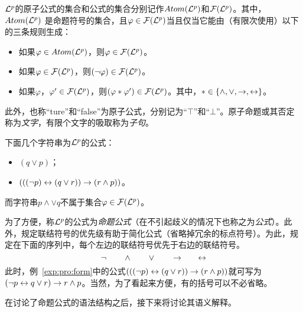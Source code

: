 ${\cal L}^p$的原子公式的集合和公式的集合分别记作$Atom({\cal L}^p)$和${\cal F}({\cal L}^p)$。其中，$Atom({\cal L}^p)$ 是命题符号的集合，且$\varphi\in {\cal F}({\cal L}^p)$当且仅当它能由（有限次使用）以下的三条规则生成\cite{luzhongwan1989}：
\begin{itemize}
	\item 如果$\varphi\in Atom({\cal L}^p)$，则$\varphi \in {\cal F}({\cal L}^p)$。
	\item 如果$\varphi \in {\cal F}({\cal L}^p)$，则$(\neg \varphi)\in {\cal F}({\cal L}^p)$。
	\item 如果$\varphi$，$\varphi'\in {\cal F}({\cal L}^p)$，则$(\varphi * \varphi')\in {\cal F}({\cal L}^p)$。其中，$*\in \{\wedge,\vee, \rightarrow, \leftrightarrow\}$。
\end{itemize}
此外，也称“ture”和“false”为原子公式，分别记为“$\top$”和“$\bot$”。原子命题或其否定称为\emph{文字}，有限个文字的吸取称为\emph{子句}。

\begin{example}\label{exp:pro:form}
	下面几个字符串为${\cal L}^p$的公式：
	\begin{itemize}
		\item $(q \vee p)$；
		\item $(((\neg p)\leftrightarrow(q\vee r))\rightarrow(r \wedge p))$。
	\end{itemize}
	而字符串$p\wedge \vee q$不属于集合$\varphi\in {\cal F}({\cal L}^p)$。
\end{example}


为了方便，称${\cal L}^p$的公式为\emph{命题公式}（在不引起歧义的情况下也称之为\emph{公式}）。此外，规定联结符号的优先级有助于简化公式（省略掉冗余的标点符号）。为此，规定在下面的序列中，每个左边的联结符号优先于右边的联结符号。
\[
\neg \qquad \wedge \qquad \vee \qquad \rightarrow \qquad \leftrightarrow
\]
此时，例~\ref{exp:pro:form}中的公式$(((\neg p)\leftrightarrow(q\vee r))\rightarrow(r \wedge p))$就可写为$(\neg p \leftrightarrow q \vee r) \rightarrow r \wedge p$。当然，为了看起来方便，有的括号可以不必省略。

在讨论了命题公式的语法结构之后，接下来将讨论其语义解释。

